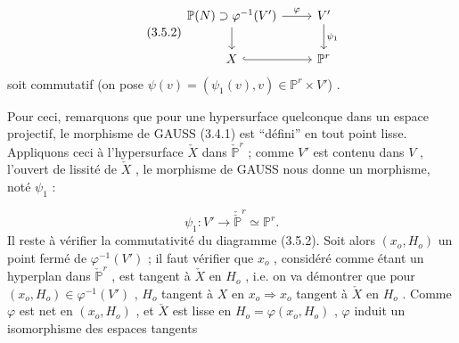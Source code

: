 \begin{equation}\tag{3.5.2}
\begin{tikzcd}
\mathbb{P}(N) \supset \varphi^{-1}(V') \arrow[r, "\varphi"] \arrow[d] & V' \arrow[d, "\psi_1"] \\
X \arrow[r, hook] & \mathbb{P}^r
\end{tikzcd}
\end{equation}
soit commutatif (on pose $\psi(v) = (\psi_1(v), v) \in \mathbb{P}^r \times V'$) .

Pour ceci, remarquons que pour une hypersurface quelconque dans un espace projectif, le morphisme de GAUSS (3.4.1) est ``défini'' en tout point lisse. Appliquons ceci à l'hypersurface $\check{X}$ dans $\check{\mathbb{P}}^r$ ; comme $V'$ est
contenu dans $V$ , l'ouvert de lissité de $\check{X}$ , le morphisme de GAUSS nous donne un morphisme, noté $\psi_1$ :

\begin{equation}\tag{3.5.3}
\psi_1 : V' \longrightarrow \check{\check{\mathbb{P}}}^r \simeq \mathbb{P}^r .
\end{equation}
Il reste à vérifier la commutativité du diagramme (3.5.2). Soit alors $(x_o, H_o)$ un point fermé de $\varphi^{-1}(V')$ ; il faut vérifier que $x_o$ , considéré comme étant un hyperplan dans $\check{\mathbb{P}}^r$ , est tangent à $\check{X}$ en $H_o$ , i.e. on va démontrer que pour $(x_o, H_o) \in \varphi^{-1}(V')$ , $H_o$ tangent à $X$ en $x_o \Rightarrow x_o$ tangent à $\check{X}$ en $H_o$ . Comme $\varphi$ est net en $(x_o, H_o)$ , et $\check{X}$ est lisse en $H_o = \varphi(x_o, H_o)$ , $\varphi$ induit un isomorphisme des espaces tangents


